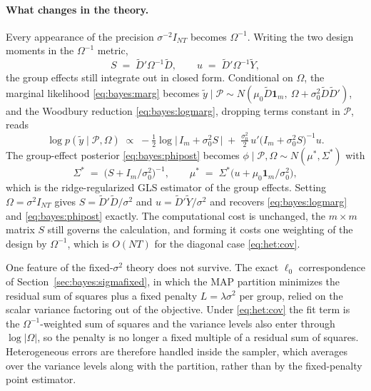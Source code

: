 \documentclass[margin=5in, 12pt]{article}
\newcommand{\1}{\mathbbm{1}}
\begin{document}
\paragraph{What changes in the theory.} Every appearance of the precision $\sigma^{-2}I_{NT}$ becomes $\Omega^{-1}$. Writing the two design moments in the $\Omega^{-1}$ metric,
\begin{equation}
  S \;=\; \tilde D'\Omega^{-1}\tilde D, \qquad u \;=\; \tilde D'\Omega^{-1}\tilde Y,
  \label{eq:het:moments}
\end{equation}
the group effects still integrate out in closed form. Conditional on $\Omega$, the marginal likelihood \eqref{eq:bayes:marg} becomes $\tilde y\mid\mathcal P \sim N(\mu_0\tilde D\mathbf 1_m,\ \Omega+\sigma_0^2\tilde D\tilde D')$, and the Woodbury reduction \eqref{eq:bayes:logmarg}, dropping terms constant in $\mathcal P$, reads
\begin{equation}
  \log p(\tilde y\mid\mathcal P,\Omega) \;\propto\; -\tfrac12\log\bigl|\,I_m+\sigma_0^2 S\,\bigr| \;+\; \tfrac{\sigma_0^2}{2}\,u'\bigl(I_m+\sigma_0^2 S\bigr)^{-1}u.
  \label{eq:het:logmarg}
\end{equation}
The group-effect posterior \eqref{eq:bayes:phipost} becomes $\phi\mid\mathcal P,\Omega \sim N(\mu^*,\Sigma^*)$ with
\begin{equation}
  \Sigma^* \;=\; \bigl(S + I_m/\sigma_0^2\bigr)^{-1}, \qquad \mu^* \;=\; \Sigma^*\bigl(u + \mu_0\mathbf 1_m/\sigma_0^2\bigr),
  \label{eq:het:phipost}
\end{equation}
which is the ridge-regularized GLS estimator of the group effects. Setting $\Omega=\sigma^2 I_{NT}$ gives $S=\tilde D'\tilde D/\sigma^2$ and $u=\tilde D'\tilde Y/\sigma^2$ and recovers \eqref{eq:bayes:logmarg} and \eqref{eq:bayes:phipost} exactly. The computational cost is unchanged, the $m\times m$ matrix $S$ still governs the calculation, and forming it costs one weighting of the design by $\Omega^{-1}$, which is $O(NT)$ for the diagonal case \eqref{eq:het:cov}.

One feature of the fixed-$\sigma^2$ theory does not survive. The exact $\ell_0$ correspondence of Section~\ref{sec:bayes:sigmafixed}, in which the MAP partition minimizes the residual sum of squares plus a fixed penalty $L=\lambda\sigma^2$ per group, relied on the scalar variance factoring out of the objective. Under \eqref{eq:het:cov} the fit term is the $\Omega^{-1}$-weighted sum of squares and the variance levels also enter through $\log|\Omega|$, so the penalty is no longer a fixed multiple of a residual sum of squares. Heterogeneous errors are therefore handled inside the sampler, which averages over the variance levels along with the partition, rather than by the fixed-penalty point estimator.
\end{document}
